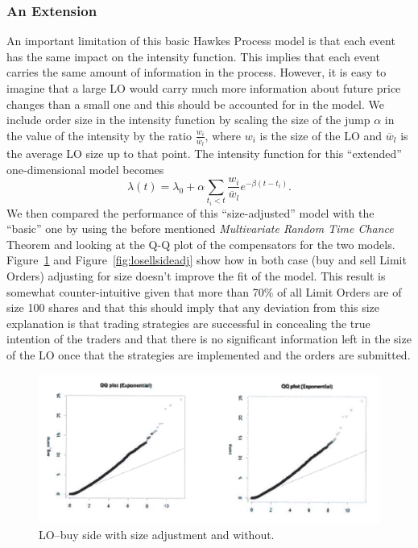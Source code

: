 \subsubsection{An Extension}

An important limitation of this basic Hawkes Process model is that each event has the same impact on the intensity function. This implies that each event carries the same amount of information in the process. However, it is easy to imagine that a large LO would carry much more information about future price changes than a small one and this should be accounted for in the model. We include order size in the intensity function by scaling the size of the jump $\alpha$ in the value of the intensity by the ratio $\frac{w_i}{\overline{w}_l}$, where $w_i$ is the size of the LO and $\overline{w}_l$ is the average LO size up to that point. The intensity function for this ``extended'' one-dimensional model becomes
	\[
	\lambda(t)= \lambda_0 + \alpha \sum_{t_i<t} \dfrac{w_i}{\overline{w}_l} e^{-\beta(t-t_i)}.
	\]
We then compared the performance of this ``size-adjusted'' model with the ``basic'' one by using the before mentioned \emph{Multivariate Random Time Chance} Theorem and looking at the Q-Q plot of the compensators for the two models. Figure~\ref{fig:lobuysideadj} and Figure~\ref{fig:losellsideadj} show how in both case (buy and sell Limit Orders) adjusting for size doesn't improve the fit of the model. This result is somewhat counter-intuitive given that more than 70\% of all Limit Orders are of size 100 shares and that this should imply that any deviation from this size explanation is that trading strategies are successful in concealing the true intention of the traders and that there is no significant information left in the size of the LO once that the strategies are implemented and the orders are submitted. 
	\begin{figure}[!ht]
   	\centering
   	\includegraphics[width=\textwidth]{chapters/chapter_trade_data_models/figures/lobuysideadj.png} 
   	\caption{LO--buy side with size adjustment and without. \label{fig:lobuysideadj}}
	\end{figure}
